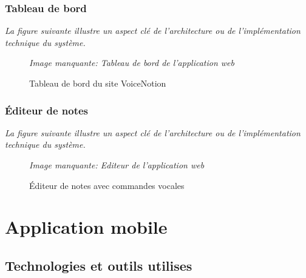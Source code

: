 \subsubsection{Tableau de bord}
\noindent
\textit{La figure suivante illustre un aspect clé de l'architecture ou de l'implémentation technique du système.}
\begin{figure}[H]
\centering
\textit{Image manquante: Tableau de bord de l'application web}
\caption{Tableau de bord du site VoiceNotion}
\label{fig:web-dashboard}
\end{figure}

\subsubsection{Éditeur de notes}
\noindent
\textit{La figure suivante illustre un aspect clé de l'architecture ou de l'implémentation technique du système.}
\begin{figure}[H]
\centering
\textit{Image manquante: Editeur de l'application web}
\caption{Éditeur de notes avec commandes vocales}
\label{fig:web-editor}
\end{figure}

\section{Application mobile}
\subsection{Technologies et outils utilises}

